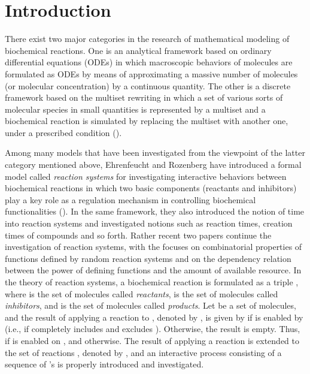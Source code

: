 \documentclass[preprint,fleqn,1p]{elsarticle}
\begin{document}
\section{Introduction}
There exist two major categories in the research of mathematical modeling of biochemical reactions.  One is an analytical framework based on ordinary differential equations (ODEs) in which macroscopic behaviors of molecules are formulated as ODEs by means of approximating a massive number of molecules (or molecular concentration) by a continuous quantity. The other is a discrete framework based on the multiset rewriting in which a set of various sorts of molecular species in small quantities is represented by a multiset and a biochemical reaction is simulated by replacing the multiset  with another one, under a prescribed condition (\cite{AV:11, CPRS:01, KMP:01, KTZ:09b, Set:01}). 

Among many models that have been investigated from the 
viewpoint of the latter category mentioned above,  Ehrenfeucht and Rozenberg have introduced a formal model called {\it reaction systems} for investigating interactive behaviors between biochemical reactions 
 in which two basic components (reactants and inhibitors) play a key role as a regulation mechanism in controlling biochemical functionalities 
(\cite{ER:07a,ER:07b,ER:09}).   In the same framework, they also introduced the notion of time into reaction systems and investigated notions such as reaction times, creation times of compounds and so forth.  Rather recent two papers  \cite{EMR:10,EMR:11} continue the investigation of reaction systems, with the focuses on combinatorial properties of functions defined by random reaction systems and on the dependency relation between the power of defining functions and  the amount of available resource.    
In the theory of reaction systems, a biochemical reaction is formulated as a triple , where  is the set of molecules called {\it reactants},  is the set of molecules called {\it inhibitors}, and  is the set of molecules called {\it products}. Let  be a set of molecules, and the result of applying a 
 reaction  to , denoted by , is given by  
if  is enabled by  (i.e., if  completely includes  
and excludes ). Otherwise, the result is empty.  Thus,  if  is enabled on , and  otherwise. The result of applying a reaction  is extended to the set of reactions , denoted by , and an interactive process 
consisting of a sequence of 's is properly introduced and investigated. 
\end{document}
